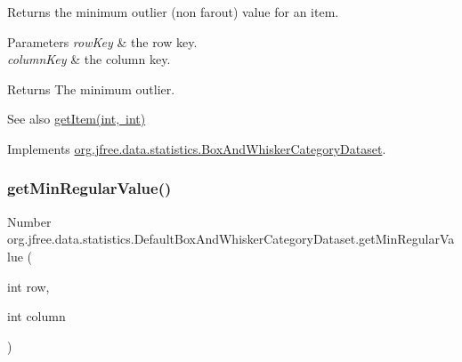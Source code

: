 Returns the minimum outlier (non farout) value for an item.


\begin{DoxyParams}{Parameters}
{\em row\+Key} & the row key. \\
\hline
{\em column\+Key} & the column key.\\
\hline
\end{DoxyParams}
\begin{DoxyReturn}{Returns}
The minimum outlier.
\end{DoxyReturn}
\begin{DoxySeeAlso}{See also}
\mbox{\hyperlink{classorg_1_1jfree_1_1data_1_1statistics_1_1_default_box_and_whisker_category_dataset_a85c944b06e4337059ea728b3a744e2a9}{get\+Item(int, int)}} 
\end{DoxySeeAlso}


Implements \mbox{\hyperlink{interfaceorg_1_1jfree_1_1data_1_1statistics_1_1_box_and_whisker_category_dataset_a8704ec25c8e5e50c44be3d2fd43bc565}{org.\+jfree.\+data.\+statistics.\+Box\+And\+Whisker\+Category\+Dataset}}.

\mbox{\label{classorg_1_1jfree_1_1data_1_1statistics_1_1_default_box_and_whisker_category_dataset_ae66a77a0c419365ccc8c3696c05d00e3}} 
\subsubsection{\texorpdfstring{get\+Min\+Regular\+Value()}{getMinRegularValue()}\hspace{0.1cm}{\footnotesize\ttfamily [1/2]}}
{\footnotesize\ttfamily Number org.\+jfree.\+data.\+statistics.\+Default\+Box\+And\+Whisker\+Category\+Dataset.\+get\+Min\+Regular\+Value (\begin{DoxyParamCaption}\item[{int}]{row,  }\item[{int}]{column }\end{DoxyParamCaption})}

